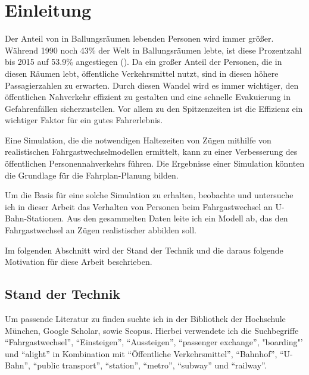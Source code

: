 \chapter{Einleitung} \label{Einleitung}
Der Anteil von in Ballungsräumen lebenden Personen wird immer größer. Während 1990 noch 43\% der Welt in Ballungsräumen lebte, ist diese Prozentzahl bis 2015 auf 53.9\% angestiegen (\cite{UnitedNations.2018}). Da ein großer Anteil der Personen, die in diesen Räumen lebt, öffentliche Verkehrsmittel nutzt, sind in diesen höhere Passagierzahlen zu  erwarten. Durch diesen Wandel wird es immer wichtiger, den öffentlichen Nahverkehr effizient zu gestalten und eine schnelle Evakuierung in Gefahrenfällen sicherzustellen. Vor allem zu den Spitzenzeiten ist die Effizienz ein wichtiger Faktor für ein gutes Fahrerlebnis.

Eine Simulation, die die notwendigen Haltezeiten von Zügen mithilfe von realistischen Fahrgastwechselmodellen ermittelt, kann zu einer Verbesserung des öffentlichen Personennahverkehrs führen. Die Ergebnisse einer Simulation könnten die Grundlage für die Fahrplan-Planung bilden.

Um die Basis für eine solche Simulation zu erhalten, beobachte und untersuche ich in dieser Arbeit das Verhalten von Personen beim Fahrgastwechsel an U-Bahn-Stationen. Aus den gesammelten Daten leite ich ein Modell ab, das den Fahrgastwechsel an Zügen realistischer abbilden soll.

Im folgenden Abschnitt wird der Stand der Technik und die daraus folgende Motivation für diese Arbeit beschrieben.
\section{Stand der Technik} \label{Stand der Technik}
Um passende Literatur zu finden suchte ich in der Bibliothek der Hochschule München, Google Scholar, sowie Scopus. Hierbei verwendete ich die Suchbegriffe "`Fahrgastwechsel"', "`Einsteigen"', "`Aussteigen"', "`passenger exchange"', "boarding"' und "`alight"' in Kombination mit "`Öffentliche Verkehrsmittel"', "`Bahnhof"', "`U-Bahn"', "`public transport"', "`station"', "`metro"', "`subway"' und "`railway"'.


